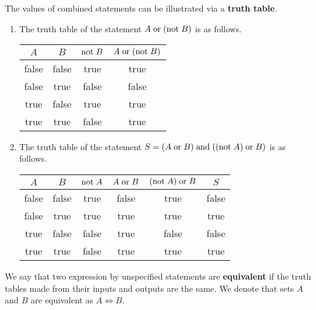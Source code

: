 The values of combined statements can be illustrated via a \textbf{truth table}.

\begin{example}
    \begin{enumerate}
        \item The truth table of the statement $A\;\text{or}\; (\text{not}\; B)$ is as follows.
        \begin{center}
            \begin{tabular}{cccc}
                \toprule
                $A$ & $B$ & $\text{not}\; B$ & $A\;\text{or}\; (\text{not}\; B)$ \\
                \midrule
                false & false & true & true \\
                false & true & false & false \\
                true & false & true & true \\
                true & true & false & true \\
                \bottomrule
            \end{tabular}
        \end{center}
        
        \item The truth table of the statement $S=(A\;\text{or}\; B)\;\text{and}\; ((\text{not}\; A)\;\text{or}\; B)$ is as follows.
        \begin{center}
            \begin{tabular}{cccccc}
                \toprule
                $A$ & $B$ & $\text{not}\; A$ & $A\;\text{or}\; B$ & $(\text{not}\; A)\;\text{or}\; B$ & $S$ \\
                \midrule
                false & false & true & false & true & false \\
                false & true & true & true & true & true \\
                true & false & false & true & false & false \\
                true & true & false & true & true & true \\
                \bottomrule
            \end{tabular}
        \end{center}
    \end{enumerate}
\end{example}

\begin{definition}
    We say that two expression by unspecified statements are \textbf{equivalent} if the truth tables made from their inputs and outputs are the same. We denote that sets $A$ and $B$ are equivalent as $A\iff B$.
\end{definition}

